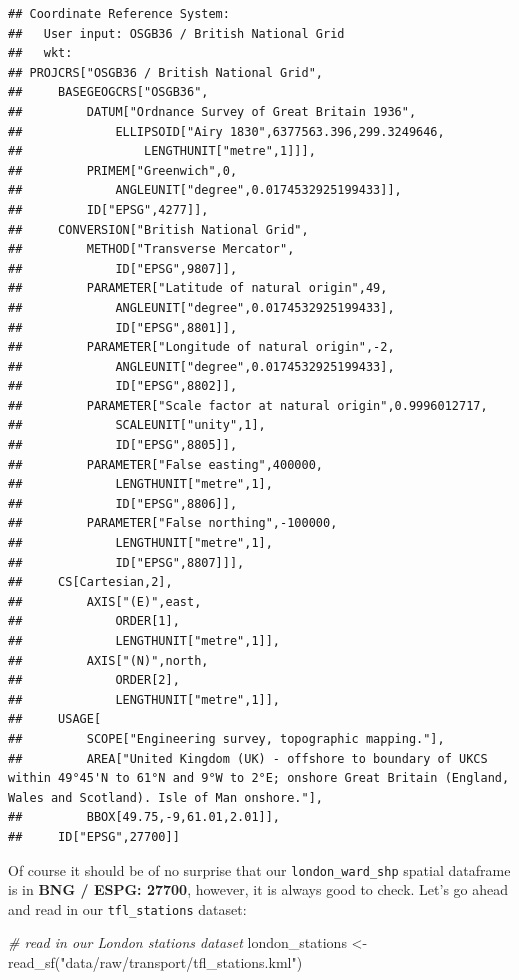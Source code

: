 \documentclass[
]{book}
\newenvironment{Shaded}{\begin{snugshade}}{\end{snugshade}}
\newcommand{\CommentTok}[1]{\textcolor[rgb]{0.56,0.35,0.01}{\textit{#1}}}
\newcommand{\FunctionTok}[1]{\textcolor[rgb]{0.00,0.00,0.00}{#1}}
\newcommand{\NormalTok}[1]{#1}
\newcommand{\OtherTok}[1]{\textcolor[rgb]{0.56,0.35,0.01}{#1}}
\newcommand{\StringTok}[1]{\textcolor[rgb]{0.31,0.60,0.02}{#1}}
\begin{document}
\begin{verbatim}
## Coordinate Reference System:
##   User input: OSGB36 / British National Grid 
##   wkt:
## PROJCRS["OSGB36 / British National Grid",
##     BASEGEOGCRS["OSGB36",
##         DATUM["Ordnance Survey of Great Britain 1936",
##             ELLIPSOID["Airy 1830",6377563.396,299.3249646,
##                 LENGTHUNIT["metre",1]]],
##         PRIMEM["Greenwich",0,
##             ANGLEUNIT["degree",0.0174532925199433]],
##         ID["EPSG",4277]],
##     CONVERSION["British National Grid",
##         METHOD["Transverse Mercator",
##             ID["EPSG",9807]],
##         PARAMETER["Latitude of natural origin",49,
##             ANGLEUNIT["degree",0.0174532925199433],
##             ID["EPSG",8801]],
##         PARAMETER["Longitude of natural origin",-2,
##             ANGLEUNIT["degree",0.0174532925199433],
##             ID["EPSG",8802]],
##         PARAMETER["Scale factor at natural origin",0.9996012717,
##             SCALEUNIT["unity",1],
##             ID["EPSG",8805]],
##         PARAMETER["False easting",400000,
##             LENGTHUNIT["metre",1],
##             ID["EPSG",8806]],
##         PARAMETER["False northing",-100000,
##             LENGTHUNIT["metre",1],
##             ID["EPSG",8807]]],
##     CS[Cartesian,2],
##         AXIS["(E)",east,
##             ORDER[1],
##             LENGTHUNIT["metre",1]],
##         AXIS["(N)",north,
##             ORDER[2],
##             LENGTHUNIT["metre",1]],
##     USAGE[
##         SCOPE["Engineering survey, topographic mapping."],
##         AREA["United Kingdom (UK) - offshore to boundary of UKCS within 49°45'N to 61°N and 9°W to 2°E; onshore Great Britain (England, Wales and Scotland). Isle of Man onshore."],
##         BBOX[49.75,-9,61.01,2.01]],
##     ID["EPSG",27700]]
\end{verbatim}

Of course it should be of no surprise that our \texttt{london\_ward\_shp} spatial dataframe is in \textbf{BNG / ESPG: 27700}, however, it is always good to check. Let's go ahead and read in our \texttt{tfl\_stations} dataset:

\begin{Shaded}
\begin{Highlighting}[]
\CommentTok{\# read in our London stations dataset}
\NormalTok{london\_stations }\OtherTok{\textless{}{-}} \FunctionTok{read\_sf}\NormalTok{(}\StringTok{"data/raw/transport/tfl\_stations.kml"}\NormalTok{)}
\end{Highlighting}
\end{Shaded}
\end{document}
